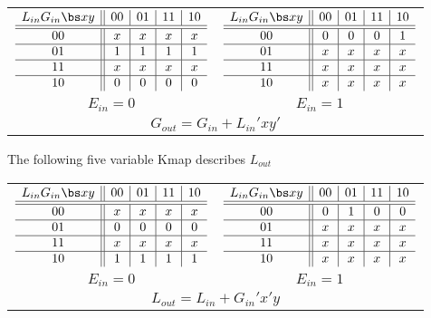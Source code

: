 \begin{enumerate}
\begin{onlysolution}
{\begin{tabular}{cc}
$\begin{array} {c||c|c|c|c}
 L_{in} G_{in}  \bs x  y & 00 & 01 & 11 & 10 \\ \hline \hline
       		00       & x  & x  & x  & x  \\ \hline
       		01       & 1  & 1  & 1  & 1  \\ \hline
       		11       & x  & x  & x  & x  \\ \hline
       		10       & 0  & 0  & 0  & 0  \\
\end{array}$ 
&
$\begin{array} {c||c|c|c|c}
 L_{in} G_{in}  \bs x  y & 00 & 01 & 11 & 10 \\ \hline \hline
       		00       & 0  & 0  & 0  & 1  \\ \hline
       		01       & x  & x  & x  & x  \\ \hline
       		11       & x  & x  & x  & x  \\ \hline
       		10       & x  & x  & x  & x  \\
\end{array}$  \\
$E_{in}=0$ & $E_{in}=1$ \\
\multicolumn{2}{c}{$G_{out} = G_{in} + L_{in}'xy'$} \\
\end{tabular}

The following five variable Kmap describes $L_{out}$

\begin{tabular}{cc}
$\begin{array} {c||c|c|c|c}
 L_{in} G_{in}  \bs x  y & 00 & 01 & 11 & 10 \\ \hline \hline
       		00       & x  & x  & x  & x  \\ \hline
       		01       & 0  & 0  & 0  & 0  \\ \hline
       		11       & x  & x  & x  & x  \\ \hline
       		10       & 1  & 1  & 1  & 1  \\
\end{array}$ 
&
$\begin{array} {c||c|c|c|c}
 L_{in} G_{in}  \bs x  y & 00 & 01 & 11 & 10 \\ \hline \hline
       		00       & 0  & 1  & 0  & 0  \\ \hline
       		01       & x  & x  & x  & x  \\ \hline
       		11       & x  & x  & x  & x  \\ \hline
       		10       & x  & x  & x  & x  \\
\end{array}$  \\
$E_{in}=0$ & $E_{in}=1$ \\
\multicolumn{2}{c}{$L_{out} = L_{in} + G_{in}'x'y$} \\
\end{tabular}
} \end{onlysolution} 


\end{enumerate}
